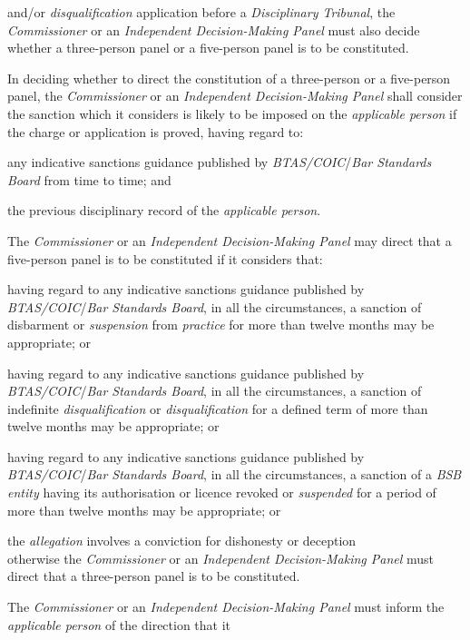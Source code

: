 and/or \emph{disqualification} application before a \emph{Disciplinary
Tribunal}, the \emph{Commissioner }or an \emph{Independent
Decision-Making Panel }must also decide whether a three-person panel or
a five-person panel is to be constituted.\\
\par
In deciding whether to direct the constitution of a three-person or a
five-person panel, the \emph{Commissioner }or an \emph{Independent
Decision-Making Panel }shall consider the sanction which it considers is
likely to be imposed on the \emph{applicable person} if the charge or
application is proved, having regard to:\\\nl \item any indicative sanctions guidance published
by \emph{BTAS/COIC}/\emph{Bar Standards Board} from time to time; and\item the previous disciplinary record of the \emph{applicable person}.\ln
{}\par
The \emph{Commissioner }or an \emph{Independent Decision-Making
Panel }may direct that a five-person panel is to be constituted if it
considers that:\\\nl \item having regard to any indicative sanctions guidance published
by \emph{BTAS/COIC}/\emph{Bar Standards Board}, in all the
circumstances, a sanction of disbarment
or \emph{suspension} from \emph{practice} for more than twelve months
may be appropriate; or\item having regard to any indicative sanctions guidance published
by \emph{BTAS/COIC}/\emph{Bar Standards Board}, in all the
circumstances, a sanction of
indefinite \emph{disqualification} or \emph{disqualification }for a
defined term of more than twelve months may be appropriate; or\item having regard to any indicative sanctions guidance published
by \emph{BTAS/COIC}/\emph{Bar Standards Board}, in all the
circumstances, a sanction of a \emph{BSB entity} having its
authorisation or licence revoked or \emph{suspended} for a period of
more than twelve months may be appropriate; or\item the \emph{allegation} involves a conviction for dishonesty or
deception\\
otherwise the \emph{Commissioner }or an \emph{Independent
Decision-Making Panel }must direct that a three-person panel is to be
constituted.\ln
{}\par
The \emph{Commissioner }or an \emph{Independent Decision-Making
Panel }must inform the \emph{applicable person} of the direction that it
